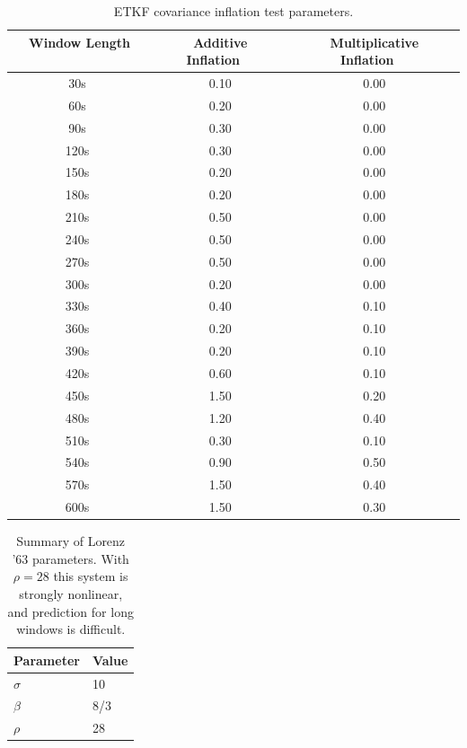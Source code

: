 \documentclass[12pt]{report}
\begin{document}
\begin{table}[h!]
\caption[ETKF covariance inflation test parameters]{ETKF covariance inflation test parameters.}
\begin{center}
\begin{tabular}{ccc}
\hline
{\bf Window Length ~~~~} & {\bf Additive Inflation~~} & {\bf Multiplicative Inflation~~}\\
\hline
\hline
~30s ~& 0.10 & 0.00 \\ \hline
~60s ~& 0.20 & 0.00 \\ \hline
~90s ~& 0.30 & 0.00 \\ \hline
~120s ~& 0.30 & 0.00 \\ \hline
~150s ~& 0.20 & 0.00 \\ \hline
~180s ~& 0.20 & 0.00 \\ \hline
~210s ~& 0.50 & 0.00 \\ \hline
~240s ~& 0.50 & 0.00 \\ \hline
~270s ~& 0.50 & 0.00 \\ \hline
~300s ~& 0.20 & 0.00 \\ \hline
~330s ~& 0.40 & 0.10 \\ \hline
~360s ~& 0.20 & 0.10 \\ \hline
~390s ~& 0.20 & 0.10 \\ \hline
~420s ~& 0.60 & 0.10 \\ \hline
~450s ~& 1.50 & 0.20 \\ \hline
~480s ~& 1.20 & 0.40 \\ \hline
~510s ~& 0.30 & 0.10 \\ \hline
~540s ~& 0.90 & 0.50 \\ \hline
~570s ~& 1.50 & 0.40 \\ \hline
~600s ~& 1.50 & 0.30 \\
\hline
\end{tabular}
\end{center}
\label{table:ETKFCovInfl}
\end{table} 

\begin{table}[h]
\caption[Summary of Lorenz '63 parameters]
  {
    Summary of Lorenz '63 parameters.
    With $\rho=28$ this system is strongly nonlinear, and prediction for long windows is difficult.
  }
\label{table:lorenz63params}
\begin{center}
\begin{tabular}{ll} \hline
Parameter & Value \\ \hline
\hline
$\sigma$ & 10 \\\hline
$\beta$ & 8/3 \\\hline
$\rho$ & 28 \\\hline
\end{tabular}
\end{center}
\end{table}
\end{document}
